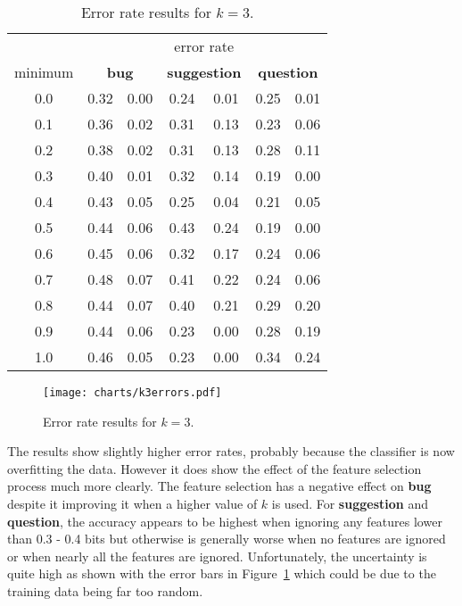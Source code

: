 \begin{table}[h]
	\centering
	\begin{tabular}{|c||cc|cc|cc|}
	\hline

	& \multicolumn{6}{c|}{error rate} \\

	minimum &
	\multicolumn{2}{c|}{\textbf{bug}} &
	\multicolumn{2}{c|}{\textbf{suggestion}} &
	\multicolumn{2}{c|}{\textbf{question}}
	
	\\
	\hline

	0.0 & 0.32 & 0.00 & 0.24 & 0.01 & 0.25 & 0.01 \\
	0.1 & 0.36 & 0.02 & 0.31 & 0.13 & 0.23 & 0.06 \\
	0.2 & 0.38 & 0.02 & 0.31 & 0.13 & 0.28 & 0.11 \\
	0.3 & 0.40 & 0.01 & 0.32 & 0.14 & 0.19 & 0.00 \\
	0.4 & 0.43 & 0.05 & 0.25 & 0.04 & 0.21 & 0.05 \\
	0.5 & 0.44 & 0.06 & 0.43 & 0.24 & 0.19 & 0.00 \\
	0.6 & 0.45 & 0.06 & 0.32 & 0.17 & 0.24 & 0.06 \\
	0.7 & 0.48 & 0.07 & 0.41 & 0.22 & 0.24 & 0.06 \\
	0.8 & 0.44 & 0.07 & 0.40 & 0.21 & 0.29 & 0.20 \\
	0.9 & 0.44 & 0.06 & 0.23 & 0.00 & 0.28 & 0.19 \\
	1.0 & 0.46 & 0.05 & 0.23 & 0.00 & 0.34 & 0.24 \\

	\hline
	\end{tabular}
	\label{tbl:mi_errors_k3}
	\caption{Error rate results for $k = 3$.}
\end{table}

\begin{figure}[h]
	\centering
	\texttt{[image: charts/k3errors.pdf]}
	\label{fig:mi_errors_k3}
	\caption{Error rate results for $k = 3$.}
\end{figure}

The results show slightly higher error rates, probably because the classifier is now overfitting the data. However it does show
the effect of the feature selection process much more clearly. The feature selection has a negative effect on \textbf{bug}
despite it improving it when a higher value of $k$ is used. For \textbf{suggestion} and \textbf{question}, the accuracy appears
to be highest when ignoring any features lower than 0.3 - 0.4 bits but otherwise is generally worse when no features are ignored
or when nearly all the features are ignored. Unfortunately, the uncertainty is quite high as shown with the error bars in
Figure~\ref{fig:mi_errors_k3} which could be due to the training data being far too random.

